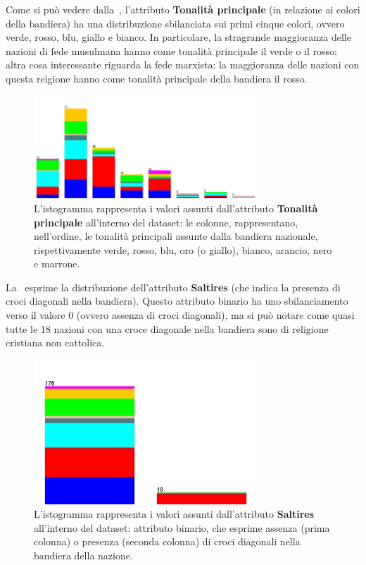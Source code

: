 \documentclass[a4paper,11pt,twoside,notitlepage,final]{scrartcl}
\begin{document}
Come si può vedere dalla~, l'attributo \textbf{Tonalità principale} (in relazione ai colori della bandiera) ha una distribuzione sbilanciata sui primi cinque colori,
ovvero verde, rosso, blu, giallo e bianco. In particolare, la stragrande maggioranza delle nazioni di fede musulmana hanno come tonalità principale il verde o il rosso; altra cosa interessante riguarda la fede marxista:
la maggioranza delle nazioni con questa reigione hanno come tonalità principale della bandiera il rosso.

\begin{figure}[H]
  \centering
  \includegraphics[width=0.75\textwidth]{fig/religion-mainhue.jpg}%
  \caption{%
    L'istogramma rappresenta i valori assunti dall'attributo \textbf{Tonalità principale}
    all'interno del dataset: le colonne, rappresentano, nell'ordine, le tonalità principali assunte dalla bandiera nazionale, rispettivamente
    verde, rosso, blu, oro (o giallo), bianco, arancio, nero e marrone.
    }%
  \label{fig:mainhue}
\end{figure}

La~ esprime la distribuzione dell'attributo \textbf{Saltires} (che indica la presenza di croci diagonali nella bandiera).
Questo attributo binario ha uno sbilanciamento verso il valore 0 (ovvero assenza di croci diagonali), ma si può notare come quasi tutte le 18 nazioni con
una croce diagonale nella bandiera sono di religione cristiana non cattolica.

\begin{figure}[H]
  \centering
  \includegraphics[width=0.75\textwidth]{fig/religion-saltires.jpg}%
  \caption{%
    L'istogramma rappresenta i valori assunti dall'attributo \textbf{Saltires}
    all'interno del dataset: attributo binario, che esprime assenza (prima colonna) o presenza (seconda colonna) di croci diagonali nella bandiera della nazione.
    }%
  \label{fig:saltires}
\end{figure}
\end{document}
